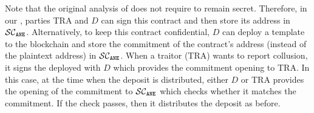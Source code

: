 Note that the original analysis of \SCtc does not require \SCtc to remain secret. Therefore, in our  \epsi, parties TRA and $ { D}$ can sign this contract and   then store its address in $\mathcal{SC}_{\mathtt{ANE}}$. Alternatively, to keep this contract confidential, $ { D}$ can deploy a template \SCtc to the blockchain and store the commitment of the contract's address (instead of the plaintext address) in $\mathcal{SC}_{\mathtt{ANE}}$. When a traitor (TRA) wants to report collusion, it signs the deployed \SCtc with  $ { D}$ which provides the commitment opening to TRA. In this case, at the time when the deposit is distributed,   either $ { D}$ or TRA   provides the opening of the commitment to  $\mathcal{SC}_{\mathtt{ANE}}$ which checks whether it matches the commitment. If the check passes, then it distributes the deposit as before. 

































